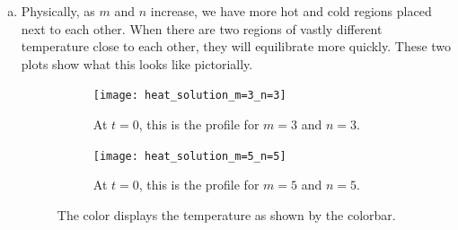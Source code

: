 \documentclass[12pt]{article} %
\begin{document}
\begin{solution}
\begin{enumerate}[(a)]
    \item Physically, as $m$ and $n$ increase, we have more hot and cold regions placed next to each other.  When there are two regions of vastly different temperature close to each other, they will equilibrate more quickly.  These two plots show what this looks like pictorially.
    \begin{figure}[H]
            \begin{subfigure}[b]{0.45\textwidth}
            	\centering
            	\texttt{[image: heat\_solution\_m=3\_n=3]}
                \caption{At $t=0$, this is the profile for $m=3$ and $n=3$.}
            \end{subfigure}
\hfill
            \begin{subfigure}[b]{0.45\textwidth}
            	\centering
                \texttt{[image: heat\_solution\_m=5\_n=5]}
                \caption{At $t=0$, this is the profile for $m=5$ and $n=5$.}
            \end{subfigure}
\caption{The color displays the temperature as shown by the colorbar.}
        \end{figure}
    
\end{enumerate}
\end{solution}
\end{document}
